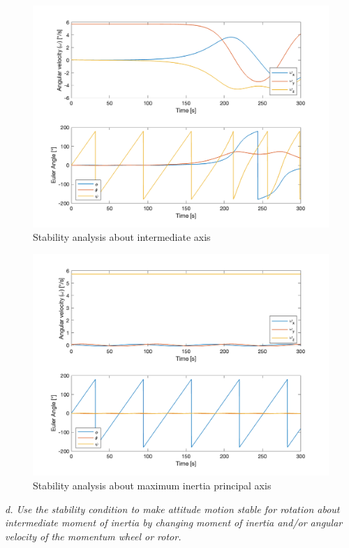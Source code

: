 \begin{figure}[H]
\centering
\includegraphics[scale=0.6]{Images/ps4_problem3c_y.png}
\caption{Stability analysis about intermediate axis}
\label{fig:ps4_problem3c_y.png}
\end{figure}

\begin{figure}[H]
\centering
\includegraphics[scale=0.6]{Images/ps4_problem3c_z.png}
\caption{Stability analysis about maximum inertia principal axis}
\label{fig:ps4_problem3c_z.png}
\end{figure}

\newpage
\textit{d. Use the stability condition to make attitude motion stable for rotation about intermediate moment of inertia by changing moment of inertia and/or angular velocity of the momentum wheel or rotor.}

